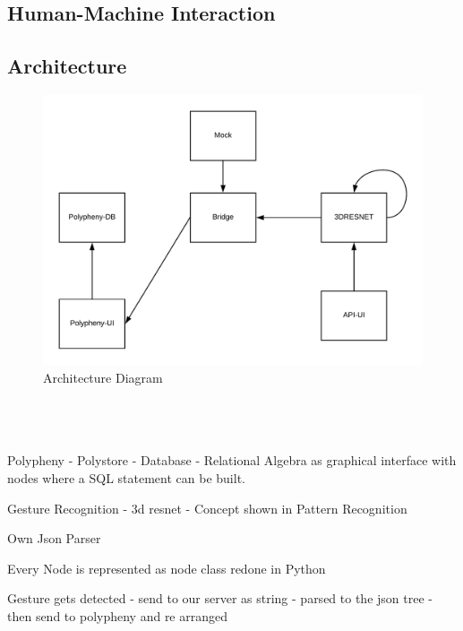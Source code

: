 \subsection{Human-Machine Interaction}

\subsection{Architecture}
\begin{figure}[H]
    \centering
    \includegraphics{reportContent/images/architecture.png}
    \caption{Architecture Diagram}
    \label{fig:my_label}
\end{figure}{}

\\
\\
\\
Polypheny - Polystore - Database - Relational Algebra as graphical interface with nodes where a SQL statement can be built. 

Gesture Recognition - 3d resnet - Concept shown in Pattern Recognition

Own Json Parser

Every Node is represented as node class redone in Python 

Gesture gets detected - send to our server as string - parsed to the json tree - then send to polypheny and re arranged

